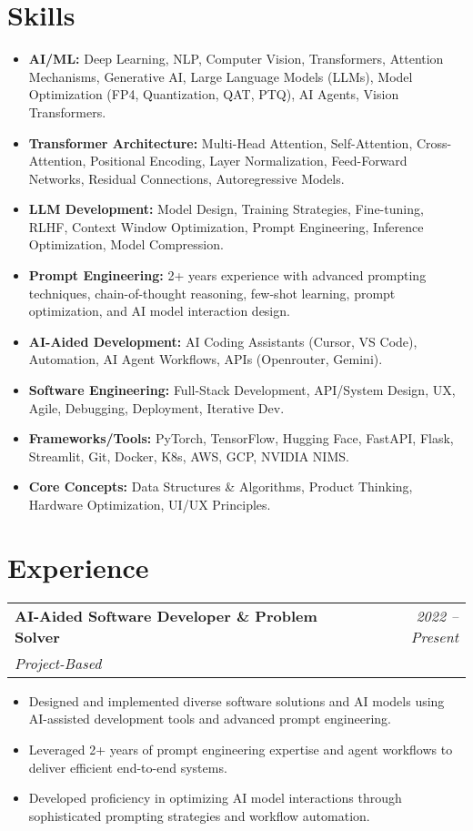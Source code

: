 \documentclass[11pt,a4paper]{article}
\makeatletter
\newcommand{\resumeSubHeading}[4]{
  \vspace{-2pt}\begin{tabular*}{\textwidth}{l@{\extracolsep{\fill}}r}
    \textbf{#1} & \textit{#2} \\
    \textit{\small#3} & \textit{\small#4} \\
  \end{tabular*}\vspace{-2pt}
}
\makeatother
\begin{document}
\section{Skills}
\begin{itemize}
    \item \textbf{AI/ML:} Deep Learning, NLP, Computer Vision, Transformers, Attention Mechanisms, Generative AI, Large Language Models (LLMs), Model Optimization (FP4, Quantization, QAT, PTQ), AI Agents, Vision Transformers.
    \item \textbf{Transformer Architecture:} Multi-Head Attention, Self-Attention, Cross-Attention, Positional Encoding, Layer Normalization, Feed-Forward Networks, Residual Connections, Autoregressive Models.
    \item \textbf{LLM Development:} Model Design, Training Strategies, Fine-tuning, RLHF, Context Window Optimization, Prompt Engineering, Inference Optimization, Model Compression.
    \item \textbf{Prompt Engineering:} 2+ years experience with advanced prompting techniques, chain-of-thought reasoning, few-shot learning, prompt optimization, and AI model interaction design.
    \item \textbf{AI-Aided Development:} AI Coding Assistants (Cursor, VS Code), Automation, AI Agent Workflows, APIs (Openrouter, Gemini).
    \item \textbf{Software Engineering:} Full-Stack Development, API/System Design, UX, Agile, Debugging, Deployment, Iterative Dev.
    \item \textbf{Frameworks/Tools:} PyTorch, TensorFlow, Hugging Face, FastAPI, Flask, Streamlit, Git, Docker, K8s, AWS, GCP, NVIDIA NIMS.
    \item \textbf{Core Concepts:} Data Structures \& Algorithms, Product Thinking, Hardware Optimization, UI/UX Principles.
\end{itemize}

\section{Experience}
\resumeSubHeading{AI-Aided Software Developer \& Problem Solver}{2022 -- Present}{Project-Based}{}
\begin{itemize}
    \item Designed and implemented diverse software solutions and AI models using AI-assisted development tools and advanced prompt engineering.
    \item Leveraged 2+ years of prompt engineering expertise and agent workflows to deliver efficient end-to-end systems.
    \item Developed proficiency in optimizing AI model interactions through sophisticated prompting strategies and workflow automation.
\end{itemize}
\end{document}

